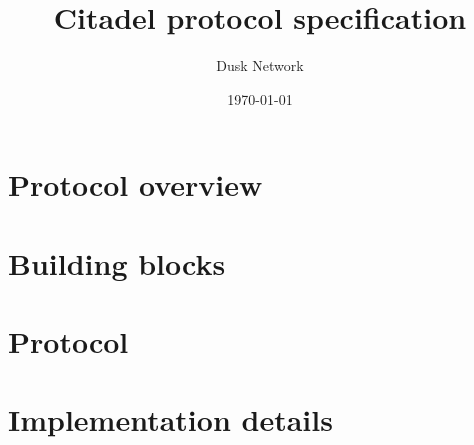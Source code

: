 \documentclass[draft]{article}
\title{Citadel protocol specification}
\author{Dusk Network}
\date{\today}
\begin{document}
	
\maketitle
\vspace{1cm}

\tableofcontents

\newpage

\section{Protocol overview}
\label{sec:general-overview}


\section{Building blocks}
\label{sec:building-blocks}


\section{Protocol}
\label{sec:protocol}


\section{Implementation details}
\label{sec:implementation}


%
%
%



\end{document}
